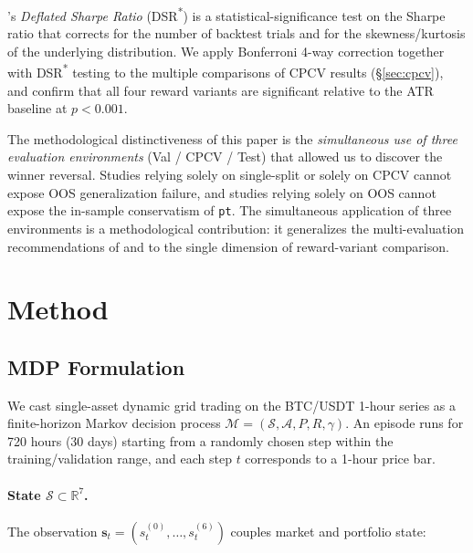 \documentclass[11pt, a4paper]{article}
\begin{document}
\citet{lopezdeprado2014dsr}'s \emph{Deflated Sharpe Ratio}
(DSR\textsuperscript{*}) is a statistical-significance test on the Sharpe
ratio that corrects for the number of backtest trials and for the skewness/kurtosis
of the underlying distribution. We apply Bonferroni 4-way correction together
with DSR\textsuperscript{*} testing to the multiple comparisons of CPCV
results (\S\ref{sec:cpcv}), and confirm that all four reward variants are
significant relative to the ATR baseline at $p<0.001$.

The methodological distinctiveness of this paper is the \emph{simultaneous use
of three evaluation environments} (Val / CPCV / Test) that allowed us to
discover the winner reversal. Studies relying solely on single-split or solely
on CPCV cannot expose OOS generalization failure, and studies relying solely
on OOS cannot expose the in-sample conservatism of \texttt{pt}. The
simultaneous application of three environments is a methodological
contribution: it generalizes the multi-evaluation recommendations of
\citet{henderson2018rlreproducibility} and \citet{gort2022backtest} to the
single dimension of reward-variant comparison.

\section{Method}
\label{sec:method}

\subsection{MDP Formulation}
\label{sec:mdp}

We cast single-asset dynamic grid trading on the BTC/USDT 1-hour series as a
finite-horizon Markov decision process $\mathcal{M} = (\mathcal{S},
\mathcal{A}, P, R, \gamma)$. An episode runs for 720 hours (30 days) starting
from a randomly chosen step within the training/validation range, and each
step $t$ corresponds to a 1-hour price bar.

\paragraph{State $\mathcal{S} \subset \mathbb{R}^7$.}
The observation $\mathbf{s}_t = (s_t^{(0)}, \ldots, s_t^{(6)})$ couples market
and portfolio state:
\end{document}
